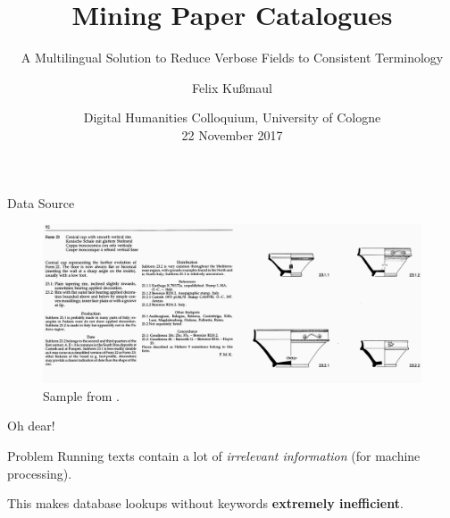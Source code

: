 \documentclass[xcolor=x11names, aspectratio=169,usenames,dvipsnames]{beamer}
\author[F.\ Kußmaul]{\large Felix Kußmaul\inst{1}}
\title[Mining Paper Catalogues]{\Large Mining Paper Catalogues}
\subtitle{\normalsize A Multilingual Solution to Reduce Verbose Fields to Consistent Terminology}
\institute[UzK]{\inst{1} Archaeological Institute, University of Cologne}
\date[22 November 2017]{\vspace*{1em}Digital Humanities Colloquium, University of Cologne\\[.5em] 22 November 2017\vspace*{1em}}
\begin{document}
\begin{frame}[plain]
\titlepage
\end{frame}

\begin{frame}{Data Source}
\begin{center}
\begin{figure}
\includegraphics[width=.875\paperwidth]{img/consp.jpg}
\caption{Sample from \cite{consp}.}
\end{figure}
\end{center}
\end{frame}

\begin{frame}{Oh dear!}
\begin{block}{Problem}\vspace{.5em}
Running texts contain a lot of \emph{irrelevant information} (for machine processing).

This makes database lookups without keywords \alert{\textbf{extremely inefficient}}.
\end{block}
\end{frame}
\end{document}
